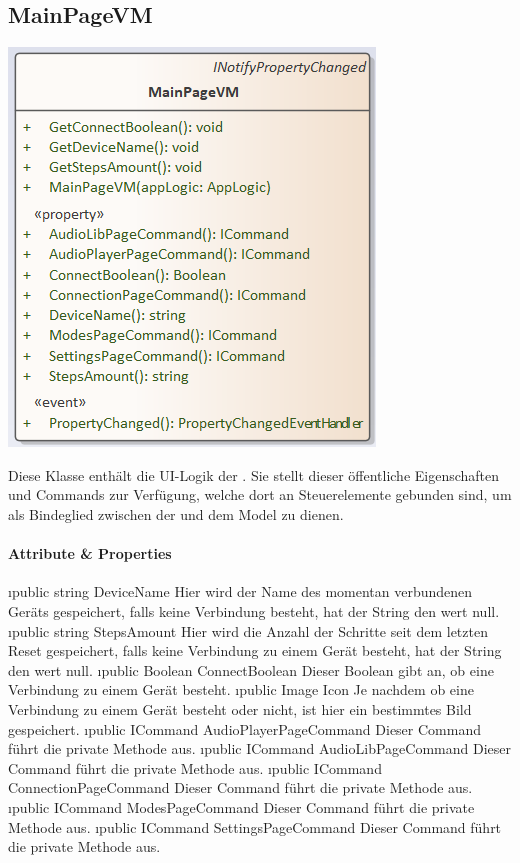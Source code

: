 \documentclass[../entwurf.tex]{subfiles}
\begin{document}
\subsection{MainPageVM}
\begin{minipage}{0.55\textwidth}
\includegraphics[scale=0.75]{../graphics/vm_klassen/MainPageVM.png}
\end{minipage}
\begin{minipage}{0.45\textwidth}
Diese Klasse enthält die UI-Logik der . Sie stellt dieser öffentliche Eigenschaften und Commands zur Verfügung, welche dort an Steuerelemente gebunden sind, um als Bindeglied zwischen der  und dem Model zu dienen.
\end{minipage}
\paragraph{Attribute \& Properties}
\begin{itemize}
	\i{public string DeviceName} Hier wird der Name des momentan verbundenen Geräts gespeichert, falls keine Verbindung besteht, hat der String den wert null.
	\i{public string StepsAmount} Hier wird die Anzahl der Schritte seit dem letzten Reset gespeichert, falls keine Verbindung zu einem Gerät besteht, hat der String den wert null.
	\i{public Boolean ConnectBoolean} Dieser Boolean gibt an, ob eine Verbindung zu einem Gerät besteht.
	\i{public Image Icon} Je nachdem ob eine Verbindung zu einem Gerät besteht oder nicht, ist hier ein bestimmtes Bild gespeichert.
	\i{public ICommand AudioPlayerPageCommand} Dieser Command führt die private Methode  aus. 
	\i{public ICommand AudioLibPageCommand} Dieser Command führt die private Methode  aus. 
	\i{public ICommand ConnectionPageCommand} Dieser Command führt die private Methode  aus. 
	\i{public ICommand ModesPageCommand} Dieser Command führt die private Methode  aus. 
	\i{public ICommand SettingsPageCommand} Dieser Command führt die private Methode  aus. 
\end{itemize}
\end{document}
